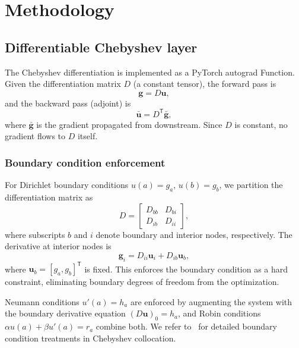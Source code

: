 \documentclass[sn-mathphys,Numbered]{sn-jnl}
\theoremstyle{thmstyleone}
\theoremstyle{thmstyletwo}
\theoremstyle{thmstylethree}
\newcommand{\T}{\mathsf{T}}
\begin{document}
\section{Methodology}\label{sec:method}

\subsection{Differentiable Chebyshev layer}\label{subsec:diff_cheb}

The Chebyshev differentiation is implemented as a PyTorch autograd Function. Given the differentiation matrix $D$ (a constant tensor), the forward pass is
\begin{equation}
    \mathbf{g} = D \mathbf{u},
    \label{eq:cheb_forward}
\end{equation}
and the backward pass (adjoint) is
\begin{equation}
    \bar{\mathbf{u}} = D^\T \bar{\mathbf{g}},
    \label{eq:cheb_backward}
\end{equation}
where $\bar{\mathbf{g}}$ is the gradient propagated from downstream. Since $D$ is constant, no gradient flows to $D$ itself.

\subsubsection{Boundary condition enforcement}
For Dirichlet boundary conditions $u(a) = g_a$, $u(b) = g_b$, we partition the differentiation matrix as
\begin{equation}
    D = \begin{bmatrix} D_{bb} & D_{bi} \\ D_{ib} & D_{ii} \end{bmatrix},
\end{equation}
where subscripts $b$ and $i$ denote boundary and interior nodes, respectively. The derivative at interior nodes is
\begin{equation}
    \mathbf{g}_i = D_{ii} \mathbf{u}_i + D_{ib} \mathbf{u}_b,
    \label{eq:dirichlet_modified}
\end{equation}
where $\mathbf{u}_b = [g_a, g_b]^\T$ is fixed. This enforces the boundary condition as a hard constraint, eliminating boundary degrees of freedom from the optimization.

Neumann conditions $u'(a) = h_a$ are enforced by augmenting the system with the boundary derivative equation $(D \mathbf{u})_0 = h_a$, and Robin conditions $\alpha u(a) + \beta u'(a) = r_a$ combine both. We refer to~\cite[Chapter~7]{trefethen2000spectral} for detailed boundary condition treatments in Chebyshev collocation.
\end{document}
